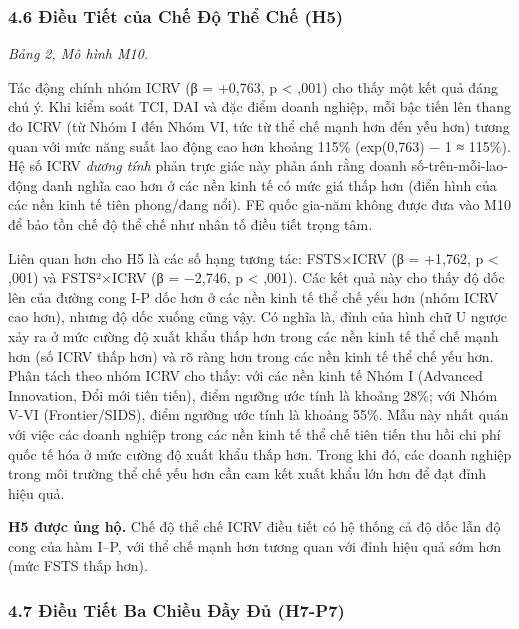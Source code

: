 \documentclass[12pt,a4paper]{article}
\begin{document}
\hypertarget{46-ux111iux1ec1u-tiux1ebft-cux1ee7a-chux1ebf-ux111ux1ed9-thux1ec3-chux1ebf-h5}{%
\subsubsection{4.6 Điều Tiết của Chế Độ Thể Chế
(H5)}\label{46-ux111iux1ec1u-tiux1ebft-cux1ee7a-chux1ebf-ux111ux1ed9-thux1ec3-chux1ebf-h5}}

\emph{Bảng 2, Mô hình M10.}

Tác động chính nhóm ICRV (β = +0,763, p \textless{} ,001) cho thấy một
kết quả đáng chú ý. Khi kiểm soát TCI, DAI và đặc điểm doanh nghiệp, mỗi
bậc tiến lên thang đo ICRV (từ Nhóm I đến Nhóm VI, tức từ thể chế mạnh
hơn đến yếu hơn) tương quan với mức năng suất lao động cao hơn khoảng
115\% (exp(0,763) − 1 ≈ 115\%). Hệ số ICRV \emph{dương tính} phản trực
giác này phản ánh rằng doanh số-trên-mỗi-lao-động danh nghĩa cao hơn ở
các nền kinh tế có mức giá thấp hơn (điển hình của các nền kinh tế tiên
phong/đang nổi). FE quốc gia-năm không được đưa vào M10 để bảo tồn chế
độ thể chế như nhân tố điều tiết trọng tâm.

Liên quan hơn cho H5 là các số hạng tương tác: FSTS×ICRV (β = +1,762, p
\textless{} ,001) và FSTS²×ICRV (β = −2,746, p \textless{} ,001). Các
kết quả này cho thấy độ dốc lên của đường cong I-P dốc hơn ở các nền
kinh tế thể chế yếu hơn (nhóm ICRV cao hơn), nhưng độ dốc xuống cũng
vậy. Có nghĩa là, đỉnh của hình chữ U ngược xảy ra ở mức cường độ xuất
khẩu thấp hơn trong các nền kinh tế thể chế mạnh hơn (số ICRV thấp hơn)
và rõ ràng hơn trong các nền kinh tế thể chế yếu hơn. Phân tách theo
nhóm ICRV cho thấy: với các nền kinh tế Nhóm I (Advanced Innovation, Đổi
mới tiên tiến), điểm ngưỡng ước tính là khoảng 28\%; với Nhóm V-VI
(Frontier/SIDS), điểm ngưỡng ước tính là khoảng 55\%. Mẫu này nhất quán
với việc các doanh nghiệp trong các nền kinh tế thể chế tiên tiến thu
hồi chi phí quốc tế hóa ở mức cường độ xuất khẩu thấp hơn. Trong khi đó,
các doanh nghiệp trong môi trường thể chế yếu hơn cần cam kết xuất khẩu
lớn hơn để đạt đỉnh hiệu quả.

\textbf{H5 được ủng hộ.} Chế độ thể chế ICRV điều tiết có hệ thống cả độ
dốc lẫn độ cong của hàm I--P, với thể chế mạnh hơn tương quan với đỉnh
hiệu quả sớm hơn (mức FSTS thấp hơn).

\hypertarget{47-ux111iux1ec1u-tiux1ebft-ba-chiux1ec1u-ux111ux1ea7y-ux111ux1ee7-h7-p7}{%
\subsubsection{4.7 Điều Tiết Ba Chiều Đầy Đủ
(H7-P7)}\label{47-ux111iux1ec1u-tiux1ebft-ba-chiux1ec1u-ux111ux1ea7y-ux111ux1ee7-h7-p7}}
\end{document}
